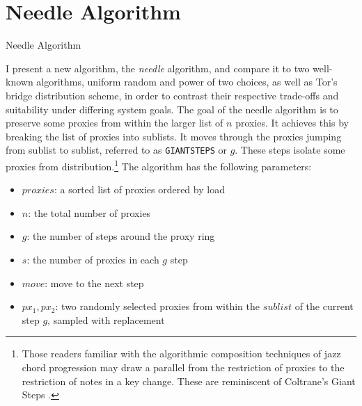 \chapter{Needle Algorithm}
\label{sec:analysis}

\begin{algorithm}[t]
\DontPrintSemicolon
{}
\caption{Needle Algorithm \label{needle}}
\end{algorithm}

I present a new algorithm, the \emph{needle} algorithm, and compare it to two well-known algorithms, uniform random and power of two choices, as well as Tor's bridge distribution scheme, in order to contrast their respective trade-offs and suitability under differing system goals. The goal of the needle algorithm is to preserve some proxies from within the larger list of $n$ proxies. It achieves this by breaking the list of proxies into sublists. It moves through the proxies jumping from sublist to sublist, referred to as \texttt{GIANTSTEPS} or $g$. These steps isolate some proxies from distribution.\footnote{Those readers familiar with the algorithmic composition techniques of jazz chord progression may draw a parallel from the restriction of proxies to the restriction of notes in a key change. These are reminiscent of Coltrane's Giant Steps \cite{lateef1981repository}.} The algorithm has the following parameters:
    \begin{itemize}
        \item $proxies$: a sorted list of proxies ordered by load
        \item $n$: the total number of proxies
        \item $g$: the number of steps around the proxy ring
        \item $s$: the number of proxies in each $g$ step
        \item $move$: move to the next step 
        \item $px_1, px_2$: two randomly selected proxies from within the $sublist$ of the current step $g$, sampled with replacement
    \end{itemize}


